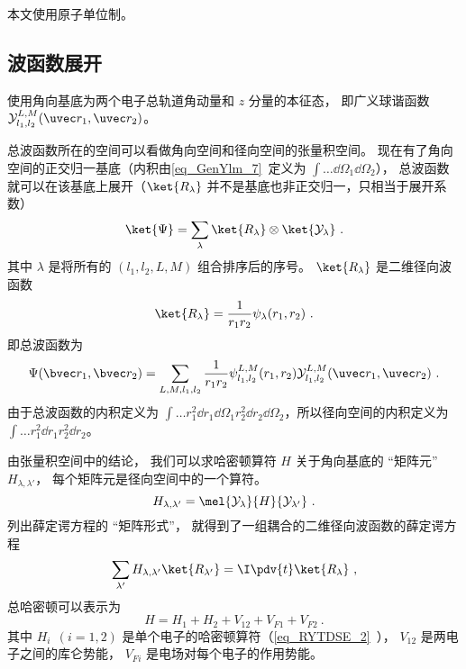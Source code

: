 

本文使用原子单位制。

\subsection{波函数展开}
使用角向基底为两个电子总轨道角动量和 $z$ 分量的本征态， 即广义球谐函数 $\mathcal{Y}_{l_1,l_2}^{L,M}(\uvec r_1, \uvec r_2)$。

总波函数所在的空间可以看做角向空间和径向空间的张量积空间。 现在有了角向空间的正交归一基底（内积由\autoref{eq_GenYlm_7}~定义为 $\int \dots \dd{\Omega_1} \dd{\Omega_2}$）， 总波函数就可以在该基底上展开（$\ket{R_\lambda}$ 并不是基底也非正交归一，只相当于展开系数）
\begin{equation}
\ket{\Psi} = \sum_\lambda \ket{R_\lambda}\otimes\ket{\mathcal{Y_\lambda}}~.
\end{equation}
其中 $\lambda$ 是将所有的 $(l_1,l_2,L,M)$ 组合排序后的序号。 $\ket{R_\lambda}$ 是二维径向波函数
\begin{equation}\label{eq_HeTDSE_6}
\ket{R_\lambda} = \frac{1}{r_1 r_2} \psi_\lambda(r_1, r_2)~.
\end{equation}
即总波函数为
\begin{equation}\label{eq_HeTDSE_2}
\Psi(\bvec r_1, \bvec r_2) = \sum_{L, M, l_1, l_2}  \frac{1}{r_1 r_2} \psi_{l_1, l_2}^{L, M}(r_1, r_2)\mathcal{Y}_{l_1, l_2}^{L, M}(\uvec r_1, \uvec r_2)~.
\end{equation}
由于总波函数的内积定义为 $\int \dots r_1^2\dd{r_1}\dd{\Omega_1} r_2^2\dd{r_2}\dd{\Omega_2}$，所以径向空间的内积定义为 $\int \dots r_1^2 \dd{r_1} r_2^2\dd{r_2}$。

由张量积空间中的结论， 我们可以求哈密顿算符 $H$ 关于角向基底的 “矩阵元” $H_{\lambda, \lambda'}$， 每个矩阵元是径向空间中的一个算符。
\begin{equation}
H_{\lambda, \lambda'} = \mel{\mathcal{Y}_{\lambda}}{H}{\mathcal{Y}_{\lambda'}}~.
\end{equation}
列出薛定谔方程的 “矩阵形式”， 就得到了一组耦合的二维径向波函数的薛定谔方程
\begin{equation}\label{eq_HeTDSE_8}
\sum_{\lambda'} H_{\lambda, \lambda'} \ket{R_{\lambda'}} = \I \pdv{t} \ket{R_{\lambda}}~,
\end{equation}
总哈密顿可以表示为
\begin{equation}\label{eq_HeTDSE_7}
H = H_1 + H_2 + V_{12} + V_{F1} + V_{F2}~.
\end{equation}
其中 $H_i \ \ (i = 1, 2)$ 是单个电子的哈密顿算符（\autoref{eq_RYTDSE_2}~）， $V_{12}$ 是两电子之间的库仑势能， $V_{Fi}$ 是电场对每个电子的作用势能。

